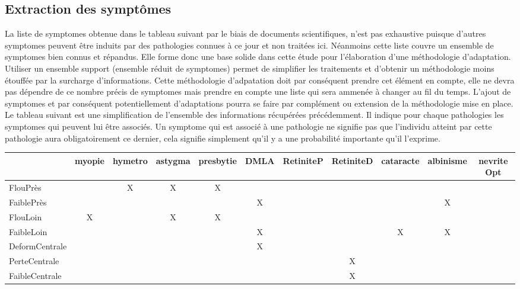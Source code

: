 \documentclass[french,a4paper]{report}
\begin{document}
{\subsection{Extraction des symptômes}
La liste de \glspl{symptome} obtenue dans le tableau suivant par le
biais de documents scientifiques, n'est pas exhaustive puisque
d'autres \glspl{symptome} peuvent être induits par des pathologies
connues à ce jour et non traitées ici. Néanmoins cette liste couvre
un ensemble de \glspl{symptome} bien connus et répandus. Elle
forme donc une base solide dans cette étude pour l'élaboration d'une
méthodologie d'adaptation.\\
Utiliser un ensemble support (ensemble réduit de \glspl{symptome}) permet de simplifier les
traitements et d'obtenir un méthodologie moins étouffée par la surcharge d'informations.
Cette méthodologie d'adpatation doit par conséquent prendre cet élément en compte, elle ne devra
pas dépendre de ce nombre précis de \glspl{symptome} mais prendre en compte une liste qui sera
ammenée à changer au fil du temps.
L'ajout de \glspl{symptome} et par conséquent potentiellement d'adaptations pourra se faire par
complément ou extension de la méthodologie mise en place. \\
Le tableau suivant est une simplification de l'ensemble des informations récupérées précédemment.
Il indique pour chaque pathologies les \glspl{symptome} qui peuvent lui être associés.
Un \gls{symptome} qui est associé à une pathologie ne signifie pas que l'individu atteint par cette
pathologie aura obligatoirement ce dernier, cela signifie simplement qu'il y a une probabilité
importante qu'il l'exprime.
\label{sctpathtableau}
\begin{landscape}
\begin{center}
\small
\begin{tabular}{|l|c|c|c|c|c|c|c|c|c|c|}
\hline
& myopie & hymetro & astygma & presbytie & DMLA & RetiniteP & RetiniteD & cataracte
& albinisme & nevrite Opt
\\ \hline
FlouPrès & &X&X&X& & & & & & \\ \hline
FaiblePrès & & & & &X& & & &X& \\ \hline
FlouLoin &X& &X&X& & & & & & \\ \hline
FaibleLoin & & & & &X& & &X&X& \\ \hline
DeformCentrale & & & & &X& & & & & \\ \hline
PerteCentrale & & & & & & &X& & & \\ \hline
FaibleCentrale & & & & & & &X& & & \\ \hline

\end{tabular}
\end{center}
\end{landscape}}
\end{document}
